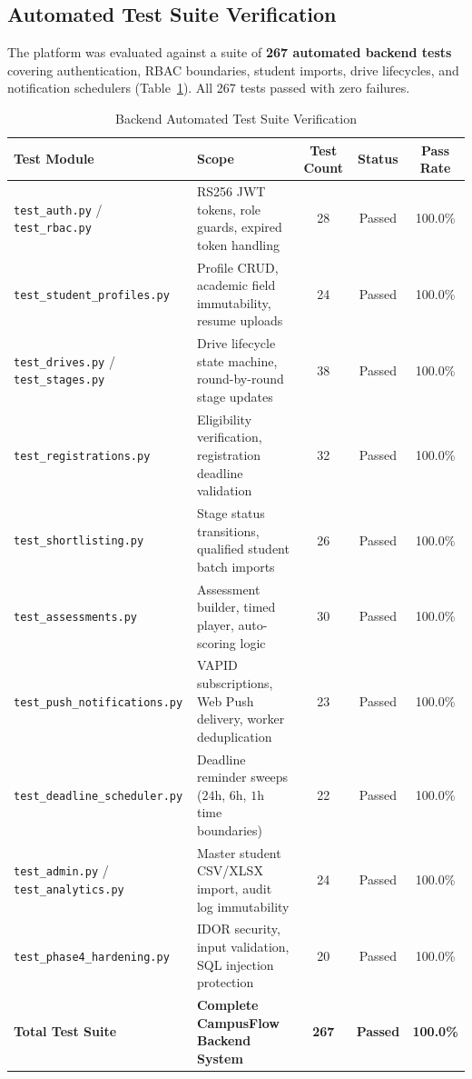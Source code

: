 \documentclass[conference]{IEEEtran}
\begin{document}
\subsection{Automated Test Suite Verification}
The platform was evaluated against a suite of \textbf{267 automated backend tests} covering authentication, RBAC boundaries, student imports, drive lifecycles, and notification schedulers (Table~\ref{tab:testresults}). All 267 tests passed with zero failures.

\begin{table}[t]
\caption{Backend Automated Test Suite Verification}
\label{tab:testresults}
\centering
\begin{tabular}{llccc}
\toprule
\textbf{Test Module} & \textbf{Scope} & \textbf{Test Count} & \textbf{Status} & \textbf{Pass Rate} \\
\midrule
\texttt{test\_auth.py} / \texttt{test\_rbac.py} & RS256 JWT tokens, role guards, expired token handling & 28 & Passed & 100.0\% \\
\texttt{test\_student\_profiles.py} & Profile CRUD, academic field immutability, resume uploads & 24 & Passed & 100.0\% \\
\texttt{test\_drives.py} / \texttt{test\_stages.py} & Drive lifecycle state machine, round-by-round stage updates & 38 & Passed & 100.0\% \\
\texttt{test\_registrations.py} & Eligibility verification, registration deadline validation & 32 & Passed & 100.0\% \\
\texttt{test\_shortlisting.py} & Stage status transitions, qualified student batch imports & 26 & Passed & 100.0\% \\
\texttt{test\_assessments.py} & Assessment builder, timed player, auto-scoring logic & 30 & Passed & 100.0\% \\
\texttt{test\_push\_notifications.py} & VAPID subscriptions, Web Push delivery, worker deduplication & 23 & Passed & 100.0\% \\
\texttt{test\_deadline\_scheduler.py} & Deadline reminder sweeps ($24\text{h}$, $6\text{h}$, $1\text{h}$ time boundaries) & 22 & Passed & 100.0\% \\
\texttt{test\_admin.py} / \texttt{test\_analytics.py} & Master student CSV/XLSX import, audit log immutability & 24 & Passed & 100.0\% \\
\texttt{test\_phase4\_hardening.py} & IDOR security, input validation, SQL injection protection & 20 & Passed & 100.0\% \\
\midrule
\textbf{Total Test Suite} & \textbf{Complete CampusFlow Backend System} & \textbf{267} & \textbf{Passed} & \textbf{100.0\%} \\
\bottomrule
\end{tabular}
\end{table}
\end{document}
